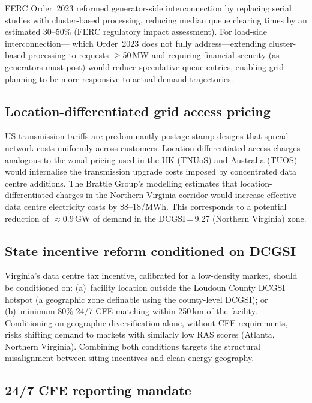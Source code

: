 \documentclass[preprint,12pt]{elsarticle}
\begin{document}
FERC Order~2023 \cite{ferc_order2023} reformed generator-side
interconnection by replacing serial studies with cluster-based processing,
reducing median queue clearing times by an estimated 30--50\%
(FERC regulatory impact assessment). For load-side interconnection---
which Order~2023 does not fully address---extending cluster-based
processing to requests $\geq$50\,MW and requiring financial security
(as generators must post) would reduce speculative queue entries, enabling
grid planning to be more responsive to actual demand trajectories.

\subsection{Location-differentiated grid access pricing}
\label{subsec:policy_pricing}

US transmission tariffs are predominantly postage-stamp designs that
spread network costs uniformly across customers. Location-differentiated
access charges analogous to the zonal pricing used in the UK (TNUoS) and
Australia (TUOS) would internalise the transmission upgrade costs imposed
by concentrated data centre additions. The Brattle Group's modelling
estimates that location-differentiated charges in the Northern Virginia
corridor would increase effective data centre electricity costs by
\$8--18/MWh.
This corresponds to a potential reduction of $\approx$0.9\,GW of demand
in the DCGSI\,=\,9.27 (Northern Virginia) zone.

\subsection{State incentive reform conditioned on DCGSI}
\label{subsec:policy_incentive}

Virginia's data centre tax incentive, calibrated for a low-density market,
should be conditioned on: (a)~facility location
outside the Loudoun County DCGSI hotspot (a geographic zone definable
using the county-level DCGSI); or (b)~minimum 80\% 24/7 CFE matching
within 250\,km of the facility. Conditioning on geographic diversification
alone, without CFE requirements, risks shifting demand to markets with
similarly low RAS scores (Atlanta, Northern Virginia). Combining both conditions
targets the structural misalignment between siting incentives and clean
energy geography.

\subsection{24/7 CFE reporting mandate}
\label{subsec:policy_cfe}
\end{document}
